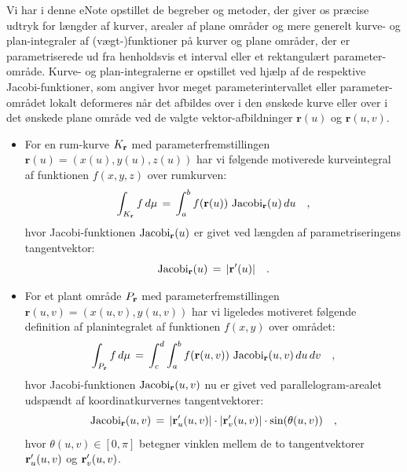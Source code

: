 
\begin{summary}
Vi har i denne eNote opstillet de begreber og metoder, der giver os præcise
udtryk for længder af kurver, arealer af plane områder og mere generelt kurve- og plan-integraler af
(vægt-)funktioner på kurver og plane områder, der er parametriserede ud fra henholdsvis et interval
eller et rektangulært parameter-område. Kurve- og plan-integralerne er opstillet ved hjælp af de respektive Jacobi-funktioner, som angiver hvor meget para\-me\-ter\-inter\-val\-let eller parameter-området lokalt deformeres når det afbildes over i den ønskede kurve eller over i det ønskede plane område ved de valgte vektor-afbildninger $\mathbf{r}(u)$ og $\mathbf{r}(u, v)$.
\begin{itemize}
\item For en rum-kurve $K_{\bf r}$ med parameterfremstillingen $\mathbf{r}(u)= (x(u), y(u), z(u))$ har vi følgende motiverede kurveintegral af funktionen $f(x,y,z)$ over rumkurven:
\begin{equation}
\int_{K_{\bf r}} f \, d\mu \, = \, \int_{a}^{b} f({\bf
r}(u))\,\operatorname{Jacobi}_{\bf r}(u)\,du \quad ,
\end{equation}
hvor {Jacobi-funktionen $\operatorname{Jacobi}_{\bf r}(u)$} er givet ved længden af parametriseringens tangentvektor:
\begin{equation}
\operatorname{Jacobi}_{\bf r}(u) \, = \,  | {\bf r}'(u) | \quad .
\end{equation}

\item For et plant område $P_{\bf r}$  med parameterfremstillingen $\mathbf{r}(u,v)= (x(u,v), y(u,v))$ har vi ligeledes motiveret følgende definition af planintegralet af funktionen $f(x,y)$ over området:
\begin{equation} \label{eqPlanIntegral}
\int_{P_{\bf r}} f \, d\mu \, = \, \int_{c}^{d} \int_{a}^{b}
f({\bf r}(u,v))\, \operatorname{Jacobi}_{\bf r}(u,v)\,du \, dv \quad,
\end{equation}
hvor Jacobi-funktionen $\operatorname{Jacobi}_{\bf r}(u,v)$ nu er givet ved parallelogram-arealet udspændt af koordinatkurvernes tangentvektorer:
\begin{equation} \label{eqJacPlan}
 \operatorname{Jacobi}_{\bf r}(u,v)\, = \,
 | {\bf r}'_{u}(u,v) | \cdot | {\bf
r}'_{v}(u,v) | \cdot \sin(\theta(u,v)) \quad ,
\end{equation}
hvor $\theta(u,v) \in [0, \pi]$ betegner vinklen mellem de to tangentvektorer ${\bf r}'_{u}(u,v)$ og ${\bf r}'_{v}(u,v)$.
\end{itemize}
\end{summary}






